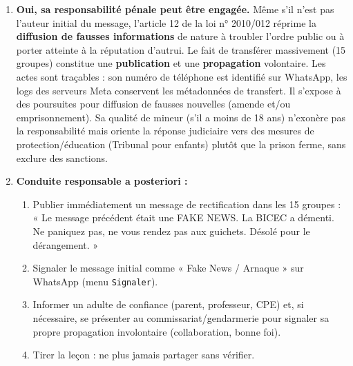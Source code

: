 \documentclass[11pt]{article}
\begin{document}
\begin{exoresolu}
\begin{enumerate}
\begin{enumerate}
      \end{enumerate}
\item \textbf{Oui, sa responsabilité pénale peut être engagée.} Même s'il n'est pas l'auteur initial du message, l'article 12 de la loi n° 2010/012 réprime la \textbf{diffusion de fausses informations} de nature à troubler l'ordre public ou à porter atteinte à la réputation d'autrui. Le fait de transférer massivement (15 groupes) constitue une \textbf{publication} et une \textbf{propagation} volontaire. Les actes sont traçables : son numéro de téléphone est identifié sur WhatsApp, les logs des serveurs Meta conservent les métadonnées de transfert. Il s'expose à des poursuites pour diffusion de fausses nouvelles (amende et/ou emprisonnement). Sa qualité de mineur (s'il a moins de 18 ans) n'exonère pas la responsabilité mais oriente la réponse judiciaire vers des mesures de protection/éducation (Tribunal pour enfants) plutôt que la prison ferme, sans exclure des sanctions.
\item \textbf{Conduite responsable a posteriori :}
      \begin{enumerate}
      \item Publier immédiatement un message de rectification dans les 15 groupes : « Le message précédent était une FAKE NEWS. La BICEC a démenti. Ne paniquez pas, ne vous rendez pas aux guichets. Désolé pour le dérangement. »
      \item Signaler le message initial comme « Fake News / Arnaque » sur WhatsApp (menu \texttt{Signaler}).
      \item Informer un adulte de confiance (parent, professeur, CPE) et, si nécessaire, se présenter au commissariat/gendarmerie pour signaler sa propre propagation involontaire (collaboration, bonne foi).
      \item Tirer la leçon : ne plus jamais partager sans vérifier.
      \end{enumerate}
\end{enumerate}
\end{exoresolu}
\end{document}
